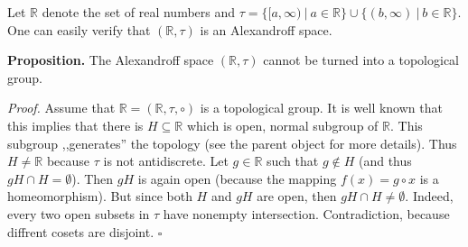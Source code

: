 \documentclass[12pt]{article}
\begin{document}
Let $\mathbb{R}$ denote the set of real numbers and $\tau=\{[a,\infty)\ |\ a\in\mathbb{R}\}\cup\{(b,\infty)\ |\ b\in\mathbb{R}\}$. One can easily verify that $(\mathbb{R},\tau)$ is an Alexandroff space.

\textbf{Proposition.} The Alexandroff space $(\mathbb{R},\tau)$ cannot be turned into a topological group.

\textit{Proof.} Assume that $\mathbb{R}=(\mathbb{R},\tau, \circ)$ is a topological group. It is well known that this implies that there is $H\subseteq\mathbb{R}$ which is open, normal subgroup of $\mathbb{R}$. This subgroup ,,generates'' the topology (see the parent object for more details). Thus $H\neq\mathbb{R}$ because $\tau$ is not antidiscrete. Let $g\in\mathbb{R}$ such that $g\not\in H$ (and thus $gH\cap H=\emptyset$). Then $gH$ is again open (because the mapping $f(x)=g\circ x$ is a homeomorphism). But since both $H$ and $gH$ are open, then $gH\cap H\neq\emptyset$. Indeed, every two open subsets in $\tau$ have nonempty intersection. Contradiction, because diffrent cosets are disjoint. $\square$
\end{document}
